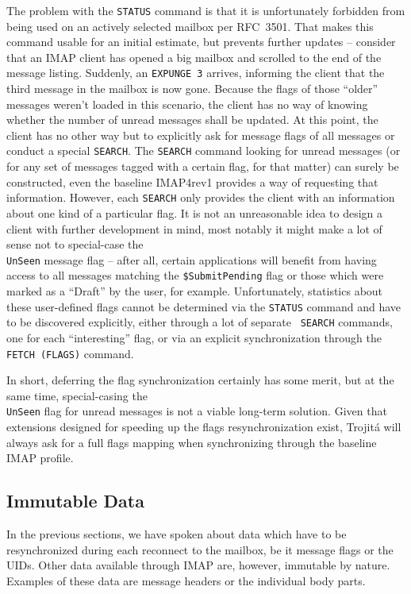 \documentclass[trojita]{subfiles}
\begin{document}
The problem with the {\tt STATUS} command is that it is unfortunately forbidden from being used on an actively selected
mailbox per RFC~3501.  That makes this command usable for an initial estimate, but prevents further updates -- consider
that an IMAP client has opened a big mailbox and scrolled to the end of the message listing.  Suddenly, an {\tt *
EXPUNGE 3} arrives, informing the client that the third message in the mailbox is now gone.  Because the flags of those
``older'' messages weren't loaded in this scenario, the client has no way of knowing whether the number of unread
messages shall be updated.  At this point, the client has no other way but to explicitly ask for message flags of all
messages or conduct a special {\tt SEARCH}.  The {\tt SEARCH} command looking for unread messages (or for any set of
messages tagged with a certain flag, for that matter) can surely be constructed, even the baseline IMAP4rev1 provides a
way of requesting that information.  However, each {\tt SEARCH} only provides the client with an information about one
kind of a particular flag.  It is not an unreasonable idea to design a client with further development in mind, most
notably it might make a lot of sense not to special-case the {\tt \\UnSeen} message flag -- after all, certain
applications will benefit from having access to all messages matching the {\tt \$SubmitPending} flag or those which were
marked as a ``Draft'' by the user, for example.  Unfortunately, statistics about these user-defined flags cannot be
determined via the {\tt STATUS} command and have to be discovered explicitly, either through a lot of separate {\tt
SEARCH} commands, one for each ``interesting'' flag, or via an explicit synchronization through the {\tt FETCH (FLAGS)}
command.

In short, deferring the flag synchronization certainly has some merit, but at the same time, special-casing the {\tt
\\UnSeen} flag for unread messages is not a viable long-term solution.  Given that extensions designed for speeding up
the flags resynchronization exist, Trojitá will always ask for a full flags mapping when synchronizing through the
baseline IMAP profile.

\subsection{Immutable Data}

In the previous sections, we have spoken about data which have to be resynchronized during each reconnect to the
mailbox, be it message flags or the UIDs.  Other data available through IMAP are, however, immutable by nature.
Examples of these data are message headers or the individual body parts.
\end{document}
